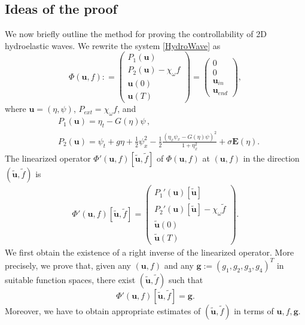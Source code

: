 \documentclass[12pt]{amsart}
\theoremstyle{remark}
\theoremstyle{definition}
\numberwithin{equation}{section}
\newcommand{\f}{\frac}
\begin{document}
\subsection{Ideas of the proof}
We now briefly outline the method for proving the controllability of 2D hydroelastic waves.
We rewrite the system \eqref{HydroWave} as 
\begin{equation} \label{e:hydro}
    \Phi (\mathbf{u}, f): =  \begin{pmatrix} P_1(\mathbf{u}) \\
    P_2(\mathbf{u})- \chi_\omega f \\
    \mathbf{u}(0) \\
     \mathbf{u}(T)
    \end{pmatrix} =  \begin{pmatrix} 0 \\
   0 \\
    \mathbf{u}_{in} \\
     \mathbf{u}_{end}
    \end{pmatrix},
\end{equation}
where $ \mathbf{u} = (\eta, \psi)$, $P_{ext} = \chi_\omega f$, and 
\begin{align*}
&P_1(\mathbf{u}) = \eta_t - G(\eta)\psi\,, \\
&P_2(\mathbf{u}) = \psi_t  + g\eta +\frac{1}{2} \psi_x^2- \f12\f{(\eta_x\psi_x-G(\eta)\psi)^2}{1+\eta^2_x} +\sigma \mathbf{E}(\eta).
\end{align*}
The linearized operator $\Phi'(\mathbf{u}, f )[\tilde{\mathbf{u}}, \tilde{f}]$ of $\Phi(\mathbf{u}, f)$ at $(\mathbf{u}, f)$ in the direction $(\tilde{\mathbf{u}}, \tilde{f})$ is
\begin{equation} \label{LinearDef}
\begin{aligned}
   \Phi'(\mathbf{u}, f )[\tilde{\mathbf{u}}, \tilde{f}] =  \begin{pmatrix} P_1'(\mathbf{u})[\tilde{\mathbf{u}}] \\
    P_2'(\mathbf{u})[\tilde{\mathbf{u}}]- \chi_\omega  \tilde{f} \\
    \tilde{\mathbf{u}}(0) \\
     \tilde{\mathbf{u}}(T)
    \end{pmatrix}.
\end{aligned}  
\end{equation}
We first obtain the existence of a right inverse of the linearized operator.
More precisely, we prove that, given any $(\mathbf{u}, f)$ and any $\mathbf{g} := (g_1, g_2, g_3, g_4)^T$ in suitable function spaces, there exist $(\tilde{\mathbf{u}}, \tilde{f})$ such that
\begin{equation}
    \Phi'(\mathbf{u}, f)[\tilde{\mathbf{u}}, \tilde{f}] =  \mathbf{g}.
\end{equation}
Moreover, we have to obtain appropriate estimates of $(\tilde{\mathbf{u}}, \tilde{f})$ in terms of $\mathbf{u}, f , \mathbf{g}$. 
\end{document}
